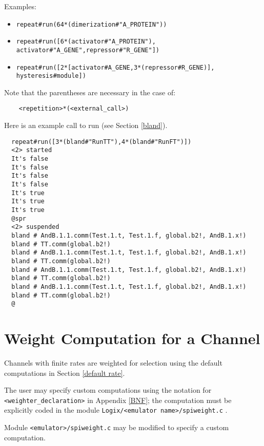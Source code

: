 \noindent
Examples:

\begin{itemize}
\item
\verb+repeat#run(64*(dimerization#"A_PROTEIN"))+
\item
\verb+repeat#run([6*(activator#"A_PROTEIN"),+ \linebreak
\verb+            activator#"A_GENE",repressor#"R_GENE"])+
\item
\verb+repeat#run([2*[activator#A_GENE,3*(repressor#R_GENE)],+ \linebreak
\verb+            hysteresis#module])+
\end{itemize}

\noindent
Note that the parentheses are necessary in the case of:

\begin{verbatim}
    <repetition>*(<external_call>)
\end{verbatim}

\noindent
Here is an example call to run (see Section \ref{bland}).

\begin{verbatim}
  repeat#run([3*(bland#"RunTT"),4*(bland#"RunFT")]) 
  <2> started
  It's false
  It's false
  It's false
  It's false
  It's true
  It's true
  It's true
  @spr
  <2> suspended
  bland # AndB.1.1.comm(Test.1.t, Test.1.f, global.b2!, AndB.1.x!)
  bland # TT.comm(global.b2!)
  bland # AndB.1.1.comm(Test.1.t, Test.1.f, global.b2!, AndB.1.x!)
  bland # TT.comm(global.b2!)
  bland # AndB.1.1.comm(Test.1.t, Test.1.f, global.b2!, AndB.1.x!)
  bland # TT.comm(global.b2!)
  bland # AndB.1.1.comm(Test.1.t, Test.1.f, global.b2!, AndB.1.x!)
  bland # TT.comm(global.b2!)
  @
\end{verbatim}

\section{Weight Computation for a Channel}
Channels with finite rates are weighted for selection using the
default computations in Section \ref{default rate}.

\noindent
The user may specify custom computations using the notation for\linebreak
\verb+<weighter_declaration>+
in Appendix \ref{BNF}; the computation must be explicitly coded in the module
\verb+Logix/<emulator name>/spiweight.c+ .

\noindent
Module \verb+<emulator>/spiweight.c+ may be modified to
specify a custom computation.

